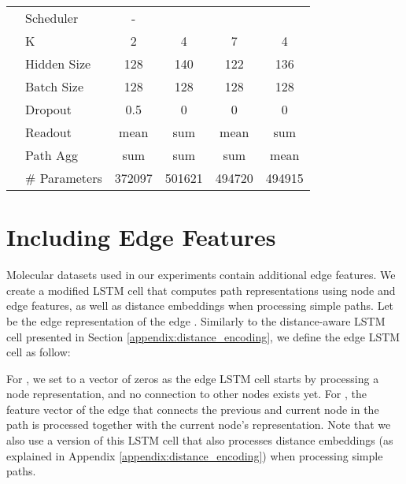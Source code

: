 \documentclass{article}
\theoremstyle{plain}
\theoremstyle{definition}
\theoremstyle{remark}
\begin{document}
\begin{table}[t]
\begin{tabular}{l|l|cccc}
& Scheduler & - &  & &  \\
& K & 2 & 4 & 7 & 4 \\
& Hidden Size & 128 & 140 & 122 & 136\\
& Batch Size & 128 &  128 & 128 & 128 \\
& Dropout & 0.5 & 0 & 0 & 0 \\
& Readout & mean & sum & mean &  sum \\
& Path Agg & sum & sum & sum & mean \\
& \# Parameters & 372097 & 501621 & 494720 & 494915\\
\bottomrule
\end{tabular}
\end{table}


\section{Including Edge Features}
\label{appendix:edge_encoding}
Molecular datasets used in our experiments contain additional edge features. We create a modified LSTM cell that computes path representations using node and edge features, as well as distance embeddings when processing simple paths. Let  be the edge representation of the edge . Similarly to the distance-aware LSTM cell presented in Section \ref{appendix:distance_encoding}, we define the edge LSTM cell as follow: 



For , we set  to a vector of zeros as the edge LSTM cell starts by processing a node representation, and no connection to other nodes exists yet. For , the feature vector of the edge that connects the previous and current node in the path is processed together with the current node's representation. Note that we also use a version of this LSTM cell that also processes distance embeddings (as explained in Appendix \ref{appendix:distance_encoding}) when processing simple paths. 
\end{document}
